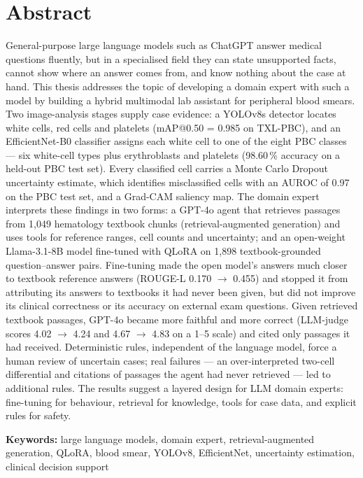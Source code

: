 \documentclass[12pt,a4paper]{article}
\begin{document}
\section*{Abstract}
General-purpose large language models such as ChatGPT answer medical questions fluently, but in a specialised field they can state unsupported facts, cannot show where an answer comes from, and know nothing about the case at hand. This thesis addresses the topic of developing a domain expert with such a model by building a hybrid multimodal lab assistant for peripheral blood smears. Two image-analysis stages supply case evidence: a YOLOv8s detector locates white cells, red cells and platelets (mAP@0.50 = 0.985 on TXL-PBC), and an EfficientNet-B0 classifier assigns each white cell to one of the eight PBC classes --- six white-cell types plus erythroblasts and platelets (98.60\,\% accuracy on a held-out PBC test set). Every classified cell carries a Monte Carlo Dropout uncertainty estimate, which identifies misclassified cells with an AUROC of 0.97 on the PBC test set, and a Grad-CAM saliency map. The domain expert interprets these findings in two forms: a GPT-4o agent that retrieves passages from 1{,}049 hematology textbook chunks (retrieval-augmented generation) and uses tools for reference ranges, cell counts and uncertainty; and an open-weight Llama-3.1-8B model fine-tuned with QLoRA on 1{,}898 textbook-grounded question--answer pairs. Fine-tuning made the open model's answers much closer to textbook reference answers (ROUGE-L 0.170 $\rightarrow$ 0.455) and stopped it from attributing its answers to textbooks it had never been given, but did not improve its clinical correctness or its accuracy on external exam questions. Given retrieved textbook passages, GPT-4o became more faithful and more correct (LLM-judge scores 4.02 $\rightarrow$ 4.24 and 4.67 $\rightarrow$ 4.83 on a 1--5 scale) and cited only passages it had received. Deterministic rules, independent of the language model, force a human review of uncertain cases; real failures --- an over-interpreted two-cell differential and citations of passages the agent had never retrieved --- led to additional rules. The results suggest a layered design for LLM domain experts: fine-tuning for behaviour, retrieval for knowledge, tools for case data, and explicit rules for safety.

\medskip
\noindent\textbf{Keywords:} large language models, domain expert, retrieval-augmented generation, QLoRA, blood smear, YOLOv8, EfficientNet, uncertainty estimation, clinical decision support
\clearpage
\end{document}
